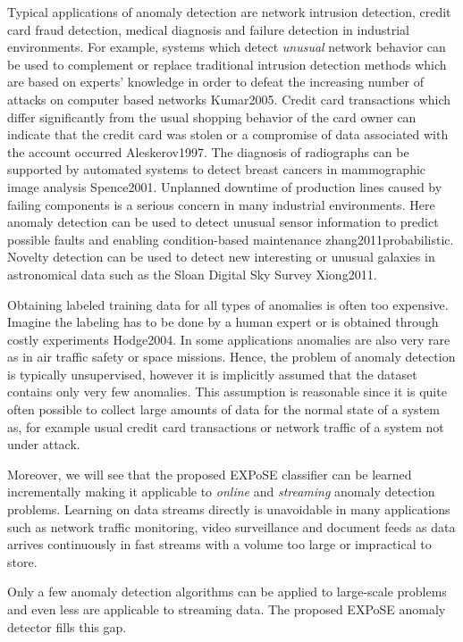 Typical applications of anomaly detection are network intrusion detection, credit card fraud detection, medical diagnosis and failure detection in industrial environments.
%
For example, systems which detect \emph{unusual} network behavior can be used to complement or replace traditional intrusion detection methods which are based on experts' knowledge in order to defeat the increasing number of attacks on computer based networks {Kumar2005}. Credit card transactions which differ significantly from the usual shopping behavior of the card owner can indicate that the credit card was stolen or a compromise of data associated with the account occurred {Aleskerov1997}.
The diagnosis of radiographs can be supported by automated systems to detect breast cancers in  mammographic image analysis {Spence2001}.
Unplanned downtime of production lines caused by failing components is a serious concern in many industrial environments. Here anomaly detection can be used to detect unusual sensor information to predict possible faults and enabling condition-based maintenance {zhang2011probabilistic}.
Novelty detection can be used to detect new interesting or unusual galaxies in astronomical data such as the Sloan Digital Sky Survey {Xiong2011}.

Obtaining labeled training data for all types of anomalies is often too expensive. Imagine the labeling has to be done by a human expert or is obtained through costly experiments {Hodge2004}. In some applications anomalies are also very rare as in air traffic safety or space missions. Hence, the problem of anomaly detection is typically unsupervised, however it is implicitly assumed that the dataset contains only very few anomalies. This assumption is reasonable since it is quite often possible to collect large amounts of data for the normal state of a system as, for example usual credit card transactions or network traffic of a system not under attack.

Moreover, we will see that the proposed EXPoSE classifier can be learned incrementally making it applicable to \emph{online} and \emph{streaming} anomaly detection problems. 
Learning on data streams directly is unavoidable in many applications such as network traffic monitoring, video surveillance and document feeds as data arrives continuously in fast streams with a volume too large or impractical to store.

Only a few anomaly detection algorithms can be applied to large-scale problems and even less are applicable to streaming data. The proposed EXPoSE anomaly detector fills this gap.

